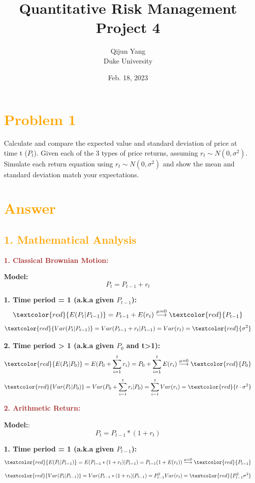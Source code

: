 \documentclass[11pt,en]{elegantpaper}
\title{Quantitative Risk Management Project 4}
\author{Qijun Yang \\ Duke University}
\institute{\href{https://fintech.meng.duke.edu}{Financial Technology at Duke University}}
\date{Feb. 18, 2023}
\begin{document}
\maketitle

\section*{\textcolor{orange}{Problem 1}}

Calculate and compare the expected value and standard deviation of price at time t ($P_t$). Given each of the 3 types of price returns, assuming $r_t\sim N(0,\sigma^2)$. Simulate each return equation using $r_t\sim N(0,\sigma^2)$ and show the mean and standard deviation match your expectations.

\section*{\textcolor{orange}{Answer}}

\subsection*{\textcolor{orange}{1. Mathematical Analysis}}

\textbf{\textcolor{brown}{1. Classical Brownian Motion: }}

\textbf{Model: }
\[P_t=P_{t-1}+r_t\]

\textbf{1. Time period = 1 (a.k.a given $P_{t-1}$):}
\[\textcolor{red}{E(P_t|P_{t-1})}=P_{t-1}+E(r_t)\stackrel{\mu=0}{\longrightarrow}\textcolor{red}{P_{t-1}}\]
\[\textcolor{red}{Var(P_t|P_{t-1})}=Var(P_{t-1}+r_t|P_{t-1})=Var(r_t)=\textcolor{red}{\sigma^2}\]

\textbf{2. Time period > 1 (a.k.a given $P_0$ and t>1):}
\[\textcolor{red}{E(P_t|P_0)}=E(P_0+\sum_{i=1}^{t}r_i)=P_0+\sum_{i=1}^{t}E(r_i)\stackrel{\mu=0}{\longrightarrow}\textcolor{red}{P_0}\]
\[\textcolor{red}{Var(P_t|P_0)}=Var(P_0+\sum_{i=1}^{t}r_i|P_0)=\sum_{i=1}^{t}Var(r_i)=\textcolor{red}{t\cdot \sigma^2}\]

\textbf{\textcolor{brown}{2. Arithmetic Return:}}

\textbf{Model:}:
\[P_t=P_{t-1}*(1+r_t)\]

\textbf{1. Time period = 1 (a.k.a given $P_{t-1}$):}
\[\textcolor{red}{E(P_t|P_{t-1})}=E(P_{t-1}*(1+r_t)|P_{t-1})=P_{t-1}(1+E(r_t))\stackrel{\mu=0}{\longrightarrow}\textcolor{red}{P_{t-1}}
\]
\[\textcolor{red}{Var(P_t|P_{t-1})}=Var(P_{t-1}*(1+r_t)|P_{t-1})=P_{t-1}^2Var(r_t)=\textcolor{red}{P_{t-1}^2\sigma^2}\]
\end{document}
